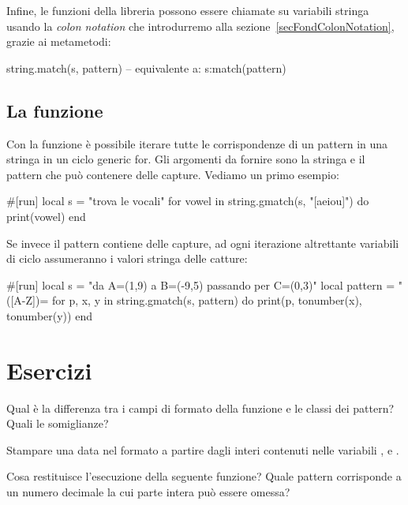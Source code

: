 Infine, le funzioni della libreria  possono essere chiamate su
variabili stringa usando la \emph{colon notation} che introdurremo alla
sezione~\ref{secFondColonNotation}, grazie ai metametodi:
\begin{lines}
string.match(s, pattern) -- equivalente a:
s:match(pattern)
\end{lines}

\subsection{La funzione }

Con la funzione  è possibile iterare
tutte le corrispondenze di un pattern in una stringa in un ciclo generic for.
Gli argomenti da fornire sono la stringa e il pattern che può contenere delle
capture. Vediamo un primo esempio:
\begin{lines}
#[run]
local s = "trova le vocali"
for vowel in string.gmatch(s, "[aeiou]") do
    print(vowel)
end
\end{lines}

Se invece il pattern contiene delle capture, ad ogni iterazione altrettante
variabili di ciclo assumeranno i valori stringa delle catture:
\begin{lines}
#[run]
local s = "da A=(1,9) a B=(-9,5) passando per C=(0,3)"
local pattern = "([A-Z])=%
for p, x, y in string.gmatch(s, pattern) do
    print(p, tonumber(x), tonumber(y))
end
\end{lines}


\section{Esercizi}

\begin{Exercise}[label=libstd-01]
Qual è la differenza tra i campi di formato della funzione  e
le classi dei pattern? Quali le somiglianze?
\end{Exercise}

\begin{Exercise}[label=libstd-02]
Stampare una data nel formato  a partire dagli interi contenuti
nelle variabili ,  e .
\end{Exercise}

\begin{Exercise}[label=libstd-03]
Cosa restituisce l'esecuzione della seguente funzione?
Quale pattern corrisponde a un numero decimale la cui parte intera può essere
omessa?
\end{Exercise}

